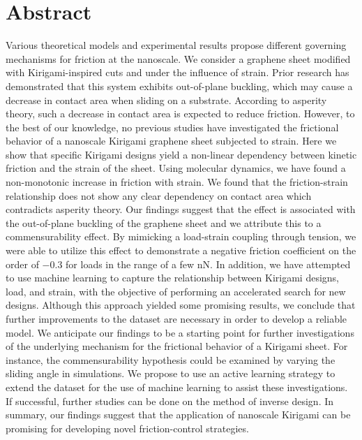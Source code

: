 \chapter*{Abstract} 
Various theoretical models and experimental results propose different governing
mechanisms for friction at the nanoscale. We consider a graphene sheet modified
with Kirigami-inspired cuts and under the influence of strain. Prior research
has demonstrated that this system exhibits out-of-plane buckling, which may cause a decrease in contact area when sliding on a substrate. According to
asperity theory, such a decrease in contact area is expected to reduce friction. However, to the best of our knowledge, no previous
studies have investigated the frictional behavior of a nanoscale Kirigami graphene
sheet subjected to strain. Here we show that specific Kirigami designs yield a
non-linear dependency between kinetic friction and the strain of the sheet.
Using molecular dynamics, we have found a non-monotonic increase in
friction with strain. We found that the friction-strain relationship does not
show any clear dependency on contact area which contradicts asperity theory. Our
findings suggest that the effect is associated with the out-of-plane buckling of
the graphene sheet and we attribute this to a commensurability effect. By
mimicking a load-strain coupling through tension, we were able to utilize this
effect to demonstrate a negative friction coefficient on the order of $-0.3$ for
loads in the range of a few nN. In addition, we have attempted to use machine
learning to capture the relationship between Kirigami designs, load, and strain,
with the objective of performing an accelerated search for new designs. Although this approach yielded some promising results, we conclude that further
improvements to the dataset are necessary in order to develop a reliable model. We anticipate our findings to be a starting point for further investigations of
the underlying mechanism for the frictional behavior of a Kirigami sheet. For
instance, the commensurability hypothesis could be examined by varying the
sliding angle in simulations. We propose to use an active learning strategy to
extend the dataset for the use of machine learning to assist these
investigations. If successful, further studies can be done on the method of
inverse design. In summary, our findings suggest that the application of
nanoscale Kirigami can be promising for developing novel friction-control
strategies.

